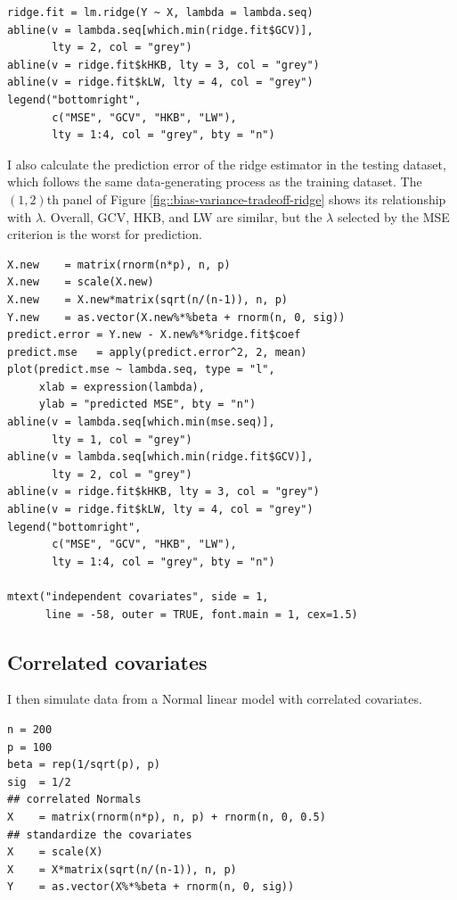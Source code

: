 \begin{lstlisting}
ridge.fit = lm.ridge(Y ~ X, lambda = lambda.seq)
abline(v = lambda.seq[which.min(ridge.fit$GCV)], 
       lty = 2, col = "grey")
abline(v = ridge.fit$kHKB, lty = 3, col = "grey")
abline(v = ridge.fit$kLW, lty = 4, col = "grey")
legend("bottomright", 
       c("MSE", "GCV", "HKB", "LW"),
       lty = 1:4, col = "grey", bty = "n")
\end{lstlisting}

I also calculate the prediction error of the ridge estimator in the testing dataset, which follows the same data-generating process as the training dataset. The $(1,2)$th panel of Figure \ref{fig::bias-variance-tradeoff-ridge} shows its relationship with $\lambda$. Overall, GCV, HKB, and LW are similar, but the $\lambda$ selected by the MSE criterion is the worst for prediction. 

\begin{lstlisting}
X.new    = matrix(rnorm(n*p), n, p) 
X.new    = scale(X.new)
X.new    = X.new*matrix(sqrt(n/(n-1)), n, p)
Y.new    = as.vector(X.new%*%beta + rnorm(n, 0, sig))
predict.error = Y.new - X.new%*%ridge.fit$coef
predict.mse   = apply(predict.error^2, 2, mean)
plot(predict.mse ~ lambda.seq, type = "l",
     xlab = expression(lambda),
     ylab = "predicted MSE", bty = "n")
abline(v = lambda.seq[which.min(mse.seq)], 
       lty = 1, col = "grey")
abline(v = lambda.seq[which.min(ridge.fit$GCV)], 
       lty = 2, col = "grey")
abline(v = ridge.fit$kHKB, lty = 3, col = "grey")
abline(v = ridge.fit$kLW, lty = 4, col = "grey")
legend("bottomright", 
       c("MSE", "GCV", "HKB", "LW"),
       lty = 1:4, col = "grey", bty = "n")

mtext("independent covariates", side = 1,
      line = -58, outer = TRUE, font.main = 1, cex=1.5)
\end{lstlisting}


\subsection{Correlated covariates}

I then simulate data from a Normal linear model with correlated covariates. 
\begin{lstlisting}
n = 200
p = 100
beta = rep(1/sqrt(p), p) 
sig  = 1/2
## correlated Normals
X    = matrix(rnorm(n*p), n, p) + rnorm(n, 0, 0.5)
## standardize the covariates
X    = scale(X)
X    = X*matrix(sqrt(n/(n-1)), n, p)
Y    = as.vector(X%*%beta + rnorm(n, 0, sig))
\end{lstlisting}


